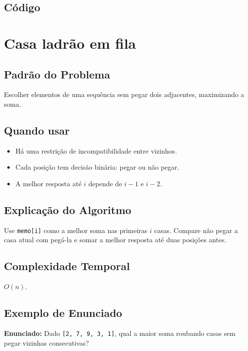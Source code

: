\subsection{Código}

\section{Casa ladrão em fila}

\subsection{Padrão do Problema}
Escolher elementos de uma sequência sem pegar dois adjacentes, maximizando a soma.

\subsection{Quando usar}
\begin{itemize}[nosep]
  \item Há uma restrição de incompatibilidade entre vizinhos.
  \item Cada posição tem decisão binária: pegar ou não pegar.
  \item A melhor resposta até $i$ depende de $i-1$ e $i-2$.
\end{itemize}

\subsection{Explicação do Algoritmo}
Use \texttt{memo[i]} como a melhor soma nas primeiras $i$ casas. Compare não pegar a casa atual com pegá-la e somar a melhor resposta até duas posições antes.

\subsection{Complexidade Temporal}
$O(n)$.

\subsection{Exemplo de Enunciado}
\begin{exemplodiabox}
\textbf{Enunciado:} Dado \texttt{[2, 7, 9, 3, 1]}, qual a maior soma roubando casas sem pegar vizinhas consecutivas?
\end{exemplodiabox}

